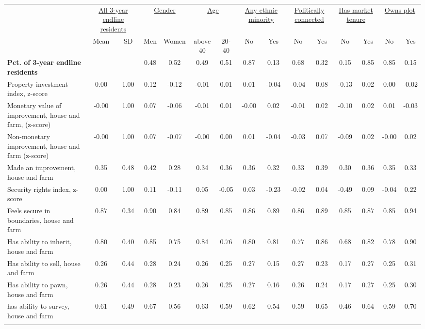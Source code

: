 \begin{tabular}{lcccccccccccccc}
\hline \noalign{\smallskip} & \multicolumn{2}{c}{\uline{\hfill All 3-year endline residents}} & \multicolumn{2}{c}{\uline{\hfill Gender \hfill}} & \multicolumn{2}{c}{\uline{\hfill Age \hfill}} & \multicolumn{2}{c}{\uline{\hfill Any ethnic minority \hfill}} & \multicolumn{2}{c}{\uline{\hfill Politically connected \hfill}} & \multicolumn{2}{c}{\uline{\hfill Has market tenure \hfill}} & \multicolumn{2}{c}{\uline{\hfill Owns plot \hfill}}\\
 & Mean & SD & Men & Women & above 40 & 20-40 & No & Yes & No & Yes & No & Yes & No & Yes\\
\noalign{\smallskip}\hline \noalign{\smallskip}\textbf{Pct. of 3-year endline residents} &  &  & 0.48 & 0.52 & 0.49 & 0.51 & 0.87 & 0.13 & 0.68 & 0.32 & 0.15 & 0.85 & 0.85 & 0.15\\
Property investment index, z-score & 0.00 & 1.00 & 0.12 & -0.12 & -0.01 & 0.01 & 0.01 & -0.04 & -0.04 & 0.08 & -0.13 & 0.02 & 0.00 & -0.02\\
\quad Monetary value of improvement, house and farm, (z-score) & -0.00 & 1.00 & 0.07 & -0.06 & -0.01 & 0.01 & -0.00 & 0.02 & -0.01 & 0.02 & -0.10 & 0.02 & 0.01 & -0.03\\
\quad Non-monetary improvement, house and farm (z-score) & -0.00 & 1.00 & 0.07 & -0.07 & -0.00 & 0.00 & 0.01 & -0.04 & -0.03 & 0.07 & -0.09 & 0.02 & -0.00 & 0.02\\
\quad Made an improvement, house and farm & 0.35 & 0.48 & 0.42 & 0.28 & 0.34 & 0.36 & 0.36 & 0.32 & 0.33 & 0.39 & 0.30 & 0.36 & 0.35 & 0.33\\
Security rights index, z-score & 0.00 & 1.00 & 0.11 & -0.11 & 0.05 & -0.05 & 0.03 & -0.23 & -0.02 & 0.04 & -0.49 & 0.09 & -0.04 & 0.22\\
\quad Feels secure in boundaries, house and farm & 0.87 & 0.34 & 0.90 & 0.84 & 0.89 & 0.85 & 0.86 & 0.89 & 0.86 & 0.89 & 0.85 & 0.87 & 0.85 & 0.94\\
\quad Has ability to inherit, house and farm & 0.80 & 0.40 & 0.85 & 0.75 & 0.84 & 0.76 & 0.80 & 0.81 & 0.77 & 0.86 & 0.68 & 0.82 & 0.78 & 0.90\\
\quad Has ability to sell, house and farm & 0.26 & 0.44 & 0.28 & 0.24 & 0.26 & 0.25 & 0.27 & 0.15 & 0.27 & 0.23 & 0.17 & 0.27 & 0.25 & 0.31\\
\quad Has ability to pawn, house and farm & 0.26 & 0.44 & 0.28 & 0.23 & 0.26 & 0.25 & 0.27 & 0.16 & 0.26 & 0.24 & 0.17 & 0.27 & 0.25 & 0.30\\
\quad has ability to survey, house and farm & 0.61 & 0.49 & 0.67 & 0.56 & 0.63 & 0.59 & 0.62 & 0.54 & 0.59 & 0.65 & 0.46 & 0.64 & 0.59 & 0.70\\
\noalign{\smallskip}\hline\end{tabular}
